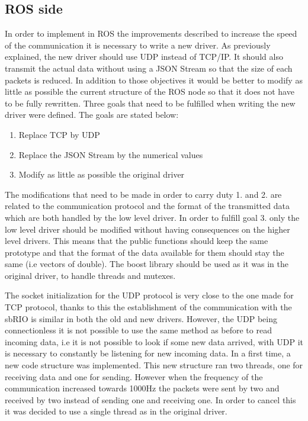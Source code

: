 \subsection{ROS side}

In order to implement in ROS the improvements described to increase the speed of the communication it is necessary to write a new driver. As previously explained, the new driver should use \gls{UDP} instead of TCP/IP. It should also transmit the actual data without using a \gls{JSON} Stream so that the size of each packets is reduced. In addition to those objectives it would be better to modify as little as possible the current structure of the ROS node so that it does not have to be fully rewritten. 
Three goals that need to be fulfilled when writing the new driver were defined. The goals are stated below:
\begin{enumerate}
	\item Replace TCP by UDP
	\item Replace the \gls{JSON} Stream by the numerical values
	\item Modify as little as possible the original driver
\end{enumerate}

The modifications that need to be made in order to carry duty 1. and 2. are related to the communication protocol and the format of the transmitted data which are both handled by the low level driver. In order to fulfill goal 3. only the low level driver should be modified without having consequences on the higher level drivers. This means that the public functions should keep the same prototype and that the format of the data available for them should stay the same (i.e vectors of double). The boost library should be used as it was in the original driver, to handle threads and mutexes.

The socket initialization for the \gls{UDP} protocol is very close to the one made for TCP protocol, thanks to this the establishment of the communication with the sbRIO is similar in both the old and new drivers. However, the \gls{UDP} being connectionless it is not possible to use the same method as before to read incoming data, i.e it is not possible to look if some new data arrived, with \gls{UDP} it is necessary to constantly be listening for new incoming data. In a first time, a new code structure was implemented. This new structure ran two threads, one for receiving data and one for sending. However when the frequency of the communication increased towards 1000Hz the packets were sent by two and received by two instead of sending one and receiving one. In order to cancel this it was decided to use a single thread as in the original driver. 

